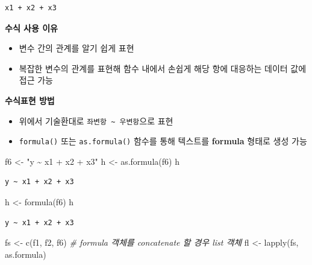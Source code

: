 \documentclass[
  11pt,
]{krantz}
\makeatletter
\newenvironment{Shaded}{\begin{snugshade}}{\end{snugshade}}
\newcommand{\CommentTok}[1]{\textcolor[rgb]{0.37,0.37,0.37}{\textit{#1}}}
\newcommand{\FunctionTok}[1]{\textcolor[rgb]{0,0,0}{#1}}
\newcommand{\NormalTok}[1]{#1}
\newcommand{\OtherTok}[1]{\textcolor[rgb]{0.37,0.37,0.37}{#1}}
\newcommand{\StringTok}[1]{\textcolor[rgb]{0.5,0.5,0.5}{#1}}
\providecommand{\tightlist}{%
  \setlength{\itemsep}{0pt}\setlength{\parskip}{0pt}}
\newenvironment{kframe}{%
\medskip{}
\setlength{\fboxsep}{.8em}
 \def\at@end@of@kframe{}%
 \ifinner\ifhmode%
  \def\at@end@of@kframe{\end{minipage}}%
  \begin{minipage}{\columnwidth}%
 \fi\fi%
 \def\FrameCommand##1{\hskip\@totalleftmargin \hskip-\fboxsep
 \colorbox{shadecolor}{##1}\hskip-\fboxsep
     \hskip-\linewidth \hskip-\@totalleftmargin \hskip\columnwidth}%
 \MakeFramed {\advance\hsize-\width
   \@totalleftmargin\z@ \linewidth\hsize
   \@setminipage}}%
 {\par\unskip\endMakeFramed%
 \at@end@of@kframe}
\renewenvironment{quote}{\begin{kframe}}{\end{kframe}}
\makeatother
\begin{document}
\begin{verbatim}
x1 + x2 + x3
\end{verbatim}

\normalsize

\textbf{수식 사용 이유}

\begin{quote}
\begin{itemize}
\tightlist
\item
  변수 간의 관계를 알기 쉽게 표현
\item
  복잡한 변수의 관계를 표현해 함수 내에서 손쉽게 해당 항에 대응하는 데이터 값에 접근 가능
\end{itemize}
\end{quote}

\textbf{수식표현 방법}

\begin{itemize}
\tightlist
\item
  위에서 기술환대로 \texttt{좌변항\ \textasciitilde{}\ 우변항}으로 표현
\item
  \texttt{formula()} 또는 \texttt{as.formula()} 함수를 통해 텍스트를 \textbf{formula} 형태로 생성 가능
\end{itemize}

\footnotesize

\begin{Shaded}
\begin{Highlighting}[]
\NormalTok{f6 }\OtherTok{\textless{}{-}} \StringTok{"y \textasciitilde{} x1 + x2 + x3"}
\NormalTok{h }\OtherTok{\textless{}{-}} \FunctionTok{as.formula}\NormalTok{(f6)}
\NormalTok{h}
\end{Highlighting}
\end{Shaded}

\begin{verbatim}
y ~ x1 + x2 + x3
\end{verbatim}

\begin{Shaded}
\begin{Highlighting}[]
\NormalTok{h }\OtherTok{\textless{}{-}} \FunctionTok{formula}\NormalTok{(f6)}
\NormalTok{h}
\end{Highlighting}
\end{Shaded}

\begin{verbatim}
y ~ x1 + x2 + x3
\end{verbatim}

\begin{Shaded}
\begin{Highlighting}[]
\NormalTok{fs }\OtherTok{\textless{}{-}} \FunctionTok{c}\NormalTok{(f1, f2, f6) }\CommentTok{\# formula 객체를 concatenate 할 경우 list 객체}
\NormalTok{fl }\OtherTok{\textless{}{-}} \FunctionTok{lapply}\NormalTok{(fs, as.formula)}
\end{Highlighting}
\end{Shaded}
\end{document}
